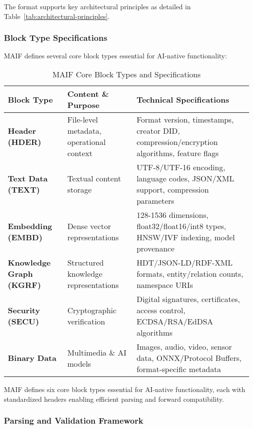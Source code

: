 \documentclass[conference]{IEEEtran}
\begin{document}
The format supports key architectural principles as detailed in Table~\ref{tab:architectural-principles}.

\subsubsection{Block Type Specifications}

MAIF defines several core block types essential for AI-native functionality:

\begin{table*}[!t]
\renewcommand{\arraystretch}{1.3}
\caption{MAIF Core Block Types and Specifications}
\label{tab:block-types}
\centering
\footnotesize
\begin{tabular}{p{3cm}p{5.5cm}p{5.5cm}}
\toprule
\textbf{Block Type} & \textbf{Content \& Purpose} & \textbf{Technical Specifications} \\
\midrule
\textbf{Header (HDER)} & File-level metadata, operational context & Format version, timestamps, creator DID, compression/encryption algorithms, feature flags \\
\textbf{Text Data (TEXT)} & Textual content storage & UTF-8/UTF-16 encoding, language codes, JSON/XML support, compression parameters \\
\textbf{Embedding (EMBD)} & Dense vector representations & 128-1536 dimensions, float32/float16/int8 types, HNSW/IVF indexing, model provenance \\
\textbf{Knowledge Graph (KGRF)} & Structured knowledge representations & HDT/JSON-LD/RDF-XML formats, entity/relation counts, namespace URIs \\
\textbf{Security (SECU)} & Cryptographic verification & Digital signatures, certificates, access control, ECDSA/RSA/EdDSA algorithms \\
\textbf{Binary Data} & Multimedia \& AI models & Images, audio, video, sensor data, ONNX/Protocol Buffers, format-specific metadata \\
\bottomrule
\end{tabular}
\end{table*}

MAIF defines six core block types essential for AI-native functionality, each with standardized headers enabling efficient parsing and forward compatibility.

\subsubsection{Parsing and Validation Framework}
\end{document}
